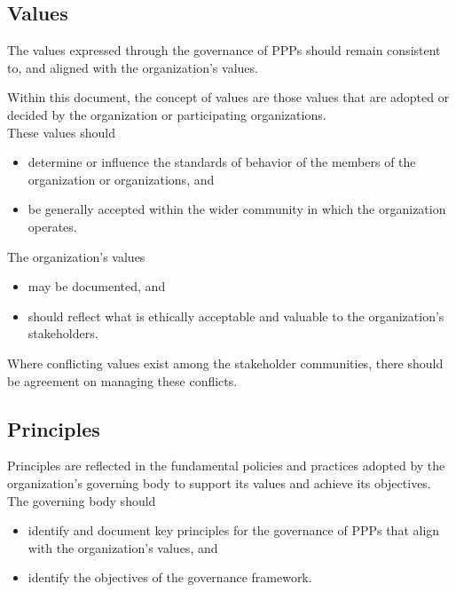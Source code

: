 \documentclass[letterpaper,10pt,english]{jupyterBook}
\begin{document}
\subsection{Values}
\label{\detokenize{PM/ppm:values}}
\sphinxAtStartPar
The values expressed through the governance of PPPs should remain consistent to, and aligned with the organization’s values.

\sphinxAtStartPar
Within this document, the concept of values are those values that are adopted or decided by the organization or participating organizations. \\
These values should
\begin{itemize}
\item {} 
\sphinxAtStartPar
determine or influence the standards of behavior of the members of the organization or organizations, and

\item {} 
\sphinxAtStartPar
be generally accepted within the wider community in which the organization operates.

\end{itemize}

\sphinxAtStartPar
The organization’s values
\begin{itemize}
\item {} 
\sphinxAtStartPar
may be documented, and

\item {} 
\sphinxAtStartPar
should reflect what is ethically acceptable and valuable to the organization’s stakeholders.

\end{itemize}

\sphinxAtStartPar
Where conflicting values exist among the stakeholder communities, there should be agreement on managing these conflicts.


\subsection{Principles}
\label{\detokenize{PM/ppm:principles}}
\sphinxAtStartPar
Principles are reflected in the fundamental policies and practices adopted by the organization’s governing body to support its values and achieve its objectives. \\
The governing body should
\begin{itemize}
\item {} 
\sphinxAtStartPar
identify and document key principles for the governance of PPPs that align with the organization’s values, and

\item {} 
\sphinxAtStartPar
identify the objectives of the governance framework.

\end{itemize}
\end{document}
